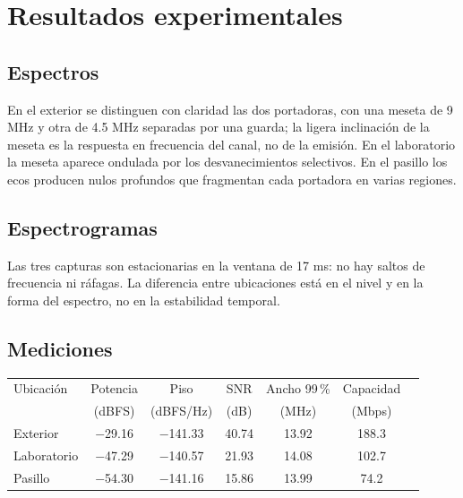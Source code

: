 \documentclass[11pt,a4paper]{article}
\begin{document}
\section{Resultados experimentales}

\subsection{Espectros}


En el exterior se distinguen con claridad las dos portadoras, con una meseta de
9 MHz y otra de 4.5 MHz separadas por una guarda; la ligera inclinación de la meseta es
la respuesta en frecuencia del canal, no de la emisión. En el laboratorio la meseta aparece
ondulada por los desvanecimientos selectivos. En el pasillo los ecos producen nulos
profundos que fragmentan cada portadora en varias regiones.

\subsection{Espectrogramas}


Las tres capturas son estacionarias en la ventana de 17 ms: no hay saltos de frecuencia ni
ráfagas. La diferencia entre ubicaciones está en el nivel y en la forma del espectro, no en
la estabilidad temporal.

\subsection{Mediciones}

\begin{tabular}{@{}lcccccc@{}}
  \toprule
  Ubicación & Potencia & Piso & SNR & Ancho 99\,\% & Capacidad \\
            & (dBFS) & (dBFS/Hz) & (dB) & (MHz) & (Mbps) \\
  \midrule
  Exterior    & $-$29.16 & $-$141.33 & 40.74 & 13.92 & 188.3 \\
  Laboratorio & $-$47.29 & $-$140.57 & 21.93 & 14.08 & 102.7 \\
  Pasillo     & $-$54.30 & $-$141.16 & 15.86 & 13.99 & 74.2 \\
  \bottomrule
\end{tabular}
\end{document}
